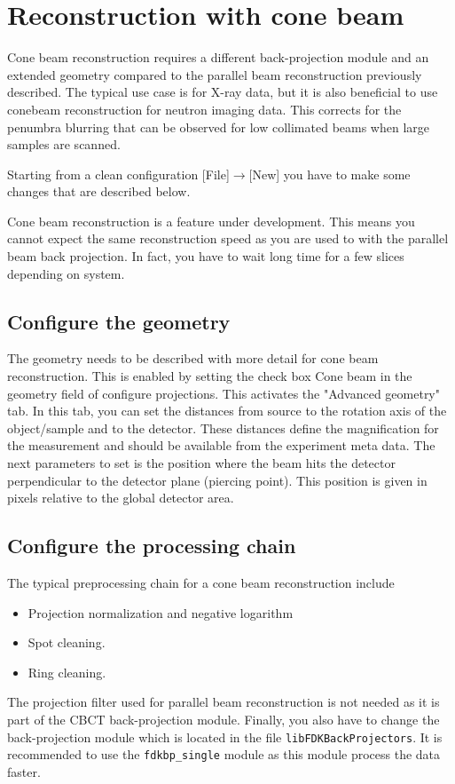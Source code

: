 \documentclass[a4paper]{scrreprt}
\begin{document}
\chapter{Reconstruction with cone beam}
Cone beam reconstruction requires a different back-projection module and an extended geometry compared to the parallel beam reconstruction previously described. The typical use case is for X-ray data, but it is also beneficial to use conebeam reconstruction for neutron imaging data. This corrects for the penumbra blurring that can be observed for low collimated beams when large samples are scanned.

Starting from a clean configuration [File]$\rightarrow$[New] you have to make some changes that are described below.

Cone beam reconstruction is a feature under development. This means you cannot expect the same reconstruction speed as you are used to with the parallel beam back projection. In fact, you have to wait long time for a few slices depending on system. 

\section{Configure the geometry}
The geometry needs to be described with more detail for cone beam reconstruction. This is enabled by setting the check box Cone beam in the geometry field of configure projections. This activates the "Advanced geometry" tab. In this tab, you can set the distances from source to the rotation axis of the object/sample and to the detector. These distances define the magnification for the measurement and should be available from the experiment meta data.  The next parameters to set is the position where the beam hits the detector perpendicular to the detector plane (piercing point). This position is given in pixels relative to the global detector area. 

\section{Configure the processing chain}
The typical preprocessing chain for a cone beam reconstruction include
\begin{itemize}
	\item Projection normalization and negative logarithm
	\item Spot cleaning.
	\item Ring cleaning.
\end{itemize}
The projection filter used for parallel beam reconstruction is not needed as it is part of the CBCT back-projection module.
Finally, you also have to change the back-projection module which is located in the file \verb+libFDKBackProjectors+. It is recommended to use the \verb+fdkbp_single+ module as this module process the data faster. 
\end{document}
